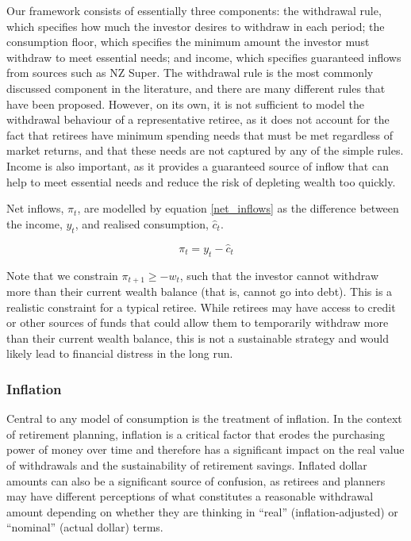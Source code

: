 \documentclass[11pt]{article}
\begin{document}
Our framework consists of essentially three components: the withdrawal rule, which specifies how much the investor desires to withdraw in each period; the consumption floor, which specifies the minimum amount the investor must withdraw to meet essential needs; and income, which specifies guaranteed inflows from sources such as NZ Super. The withdrawal rule is the most commonly discussed component in the literature, and there are many different rules that have been proposed. However, on its own, it is not sufficient to model the withdrawal behaviour of a representative retiree, as it does not account for the fact that retirees have minimum spending needs that must be met regardless of market returns, and that these needs are not captured by any of the simple rules. Income is also important, as it provides a guaranteed source of inflow that can help to meet essential needs and reduce the risk of depleting wealth too quickly.

Net inflows, \(\pi_t\), are modelled by equation \ref{net_inflows} as the difference between the income, \(y_t\), and realised consumption, \(\hat{c}_t\). 

\begin{equation}\label{net_inflows}
  \pi_t = y_t - \hat{c}_t
\end{equation}

Note that we constrain \(\pi_{t+1} \ge -w_t\), such that the investor cannot withdraw more than their current wealth balance (that is, cannot go into debt). This is a realistic constraint for a typical retiree. While retirees may have access to credit or other sources of funds that could allow them to temporarily withdraw more than their current wealth balance, this is not a sustainable strategy and would likely lead to financial distress in the long run.

\subsubsection{Inflation}

Central to any model of consumption is the treatment of inflation. In the context of retirement planning, inflation is a critical factor that erodes the purchasing power of money over time and therefore has a significant impact on the real value of withdrawals and the sustainability of retirement savings. Inflated dollar amounts can also be a significant source of confusion, as retirees and planners may have different perceptions of what constitutes a reasonable withdrawal amount depending on whether they are thinking in ``real'' (inflation-adjusted) or ``nominal'' (actual dollar) terms.
\end{document}
